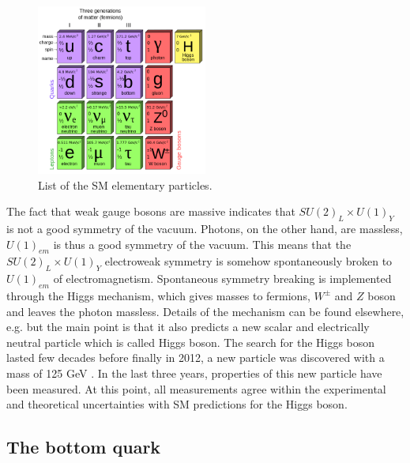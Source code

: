 \begin{figure}[htbp]
	\centering
		\includegraphics[width=0.5\textwidth]{Figures/Elementary_Particles.png}
	\caption[List of Standard model elementary particles]{List of the SM elementary particles.}
	\label{fig:SM_particles}
\end{figure} 
\par The fact that weak gauge bosons are massive indicates that $SU(2)_L \times U(1)_Y$ is not a good symmetry of the vacuum. Photons, on the other hand, are massless, $U(1)_{em}$ is thus a good symmetry of the vacuum. This means that the $SU(2)_L \times U(1)_Y$ electroweak symmetry is somehow spontaneously broken to $U(1)_{em}$ of electromagnetism. Spontaneous symmetry breaking is implemented through the Higgs mechanism, which gives masses to fermions, $W^{\pm}$ and $Z$ boson and leaves the photon massless. Details of the mechanism can be found elsewhere, e.g. \cite{Griffiths:1987tj} but the main point is that it also predicts a new scalar and electrically neutral particle which is called Higgs boson. The search for the Higgs boson lasted few decades before finally in 2012, a new particle was discovered with a mass of 125 GeV \cite{Aad:2012tfa,Chatrchyan:2012ufa}. In the last three years, properties of this new particle have been measured. At this point, all measurements agree within the experimental and theoretical uncertainties with SM predictions for the Higgs boson.    
   


\subsection{The bottom quark}

